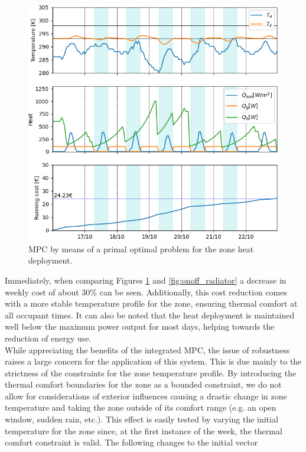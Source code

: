 \begin{figure}[H]
\centering
\includegraphics[scale=0.8]{images/mpc_primal.png}
\caption{MPC by means of a primal optimal problem for the zone heat deployment.}
\label{fig:mpc_primal}
\end{figure}

Immediately, when comparing Figures \ref{fig:mpc_primal} and \ref{fig:onoff_radiator} a decrease in weekly cost of about 30\% can be seen. Additionally, this cost reduction comes with a more stable temperature profile for the zone, ensuring thermal comfort at all occupant times. It can also be noted that the heat deployment is maintained well below the maximum power output for most days, helping towards the reduction of energy use.\\

While appreciating the benefits of the integrated MPC, the issue of robustness raises a large concern for the application of this system. This is due mainly to the strictness of the constraints for the zone temperature profile. By introducing the thermal comfort boundaries for the zone as a bounded constraint, we do not allow for considerations of exterior influences causing a drastic change in zone temperature and taking the zone outside of its comfort range (e.g. an open window, sudden rain, etc.). This effect is easily tested by varying the initial temperature for the zone since, at the first instance of the week, the thermal comfort constraint is valid. The following changes to the initial vector

